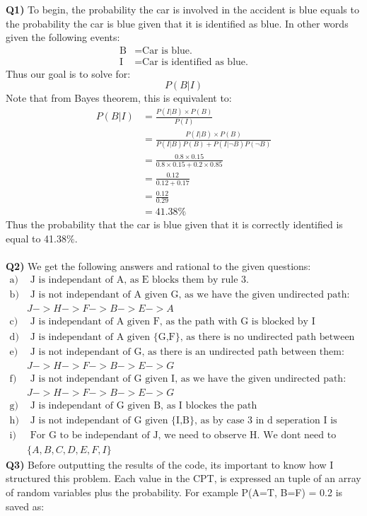 \documentclass{article}
\begin{document}
\begin{titlepage}
\vspace{0.5cm}
\textbf{Q1)} To begin, the probability the car is involved in the accident is blue equals to the probability the car is blue given that it is identified as blue. In other words given the following events:
\begin{align*}
\text{B} &= \text{Car is blue.} \\
\text{I} &= \text{Car is identified as blue.}
\end{align*}
Thus our goal is to solve for:
\[ P(B|I) \]
Note that from Bayes theorem, this is equivalent to:
\begin{align*}
P(B|I) &= \frac{P(I|B)\times P(B)}{P(I)} \\
&= \frac{P(I|B)\times P(B)}{P(I|B)P(B) + P(I|\neg B)P(\neg B)} \\
&= \frac{0.8 \times 0.15}{0.8 \times 0.15 + 0.2 \times 0.85} \\
&= \frac{0.12}{0.12 + 0.17} \\
&= \frac{0.12}{0.29} \\
&= 41.38\%
\end{align*}
Thus the probability that the car is blue given that it is correctly identified is equal to 41.38$\%$.\\\\
\textbf{Q2)} We get the following answers and rational to the given questions:
\begin{align*}
\text{a)} & \text{ J is independant of A, as E blocks them by rule 3.} \\
\text{b)} & \text{ J is not independant of A given G, as we have the given undirected path:} \\
& J -> H -> F -> B -> E -> A\\
\text{c)} & \text{ J is independant of A given F, as the path with G is blocked by I} \\
\text{d)} & \text{ J is independant of A given \{G,F\}, as there is no undirected path between them.} \\
\text{e)} & \text{ J is not independant of G, as there is an undirected path between them:} \\
& J -> H -> F -> B -> E -> G\\
\text{f)} & \text{ J is not independant of G given I, as we have the given undirected path:} \\
& J -> H -> F -> B -> E -> G \\
\text{g)} & \text{ J is independant of G given B, as I blockes the path} \\
\text{h)} & \text{ J is not independant of G given \{I,B\}, as by case 3 in d seperation I is blocking.} \\
\text{i)} & \text{ For G to be independant of J, we need to observe H. We dont need to oberserve any of the following:} \\
& \{A,B,C,D,E,F,I\}
\end{align*}
\newpage
\textbf{Q3)} Before outputting the results of the code, its important to know how I structured this problem. Each value in the CPT, is expressed an tuple of an array of random variables plus the probability. For example P(A=T, B=F) = 0.2 is saved as:


\end{titlepage}
\end{document}
